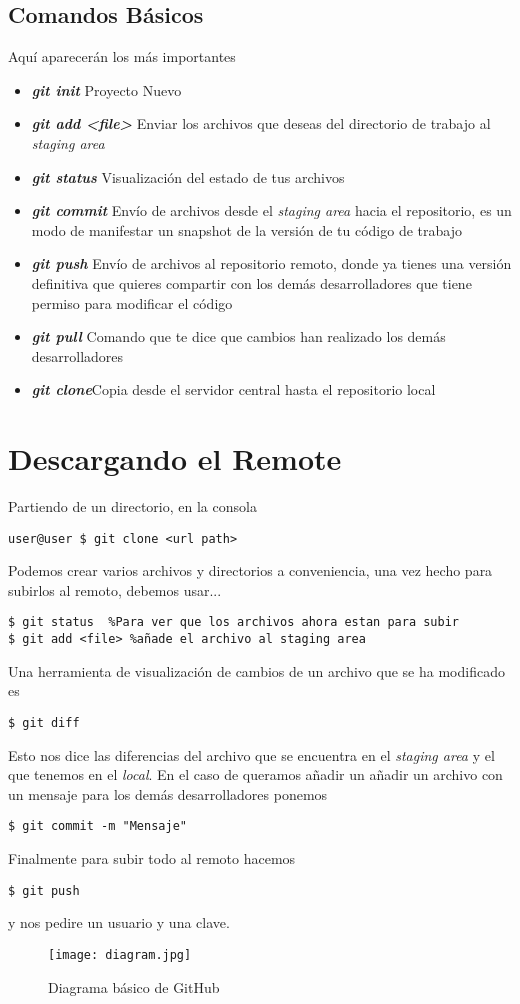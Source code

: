 \documentclass[letterpaper,12pt]{article}
\begin{document}
\subsection{Comandos Básicos}
Aquí aparecerán los más importantes
\begin{itemize}
\item \textbf{\textit{git init}} Proyecto Nuevo
\item \textbf{\textit{git add <file>}} Enviar los archivos que deseas del directorio de trabajo al \textit{staging area}
\item \textbf{\textit{git status}} Visualización del estado de tus archivos
\item \textbf{\textit{git commit}} Envío de archivos desde el \textit{staging area} hacia el repositorio, es un modo de manifestar un snapshot de la versión de tu código de trabajo
\item \textbf{\textit{git push}} Envío de archivos al repositorio remoto, donde ya tienes una versión definitiva que quieres compartir con los demás desarrolladores que tiene permiso para modificar el código
\item \textbf{\textit{git pull}} Comando que te dice que cambios han realizado los demás desarrolladores
\item \textbf{\textit{git clone}}Copia desde el servidor central hasta el repositorio local

\end{itemize}

\section{Descargando el Remote}
Partiendo de un directorio, en la consola
\begin{verbatim}
user@user $ git clone <url path>
\end{verbatim}
Podemos crear varios archivos y directorios a conveniencia, una vez hecho para subirlos al remoto, debemos usar...
\begin{verbatim}
$ git status  %Para ver que los archivos ahora estan para subir
$ git add <file> %añade el archivo al staging area
\end{verbatim}
Una herramienta de visualización de cambios de un archivo que se ha modificado es
\begin{verbatim}
$ git diff
\end{verbatim}
Esto nos dice las diferencias del archivo que se encuentra en el \textit{staging area} y el que tenemos en el \textit{local}. En el caso de queramos añadir un añadir un archivo con un mensaje para los demás desarrolladores ponemos
\begin{verbatim}
$ git commit -m "Mensaje"
\end{verbatim}
Finalmente para subir todo al remoto hacemos
\begin{verbatim}
$ git push
\end{verbatim}
y nos pedire un usuario y una clave.
\begin{figure}[!b]
	\centering
  \texttt{[image: diagram.jpg]}
  \caption{Diagrama básico de GitHub}
  \label{fig:diagram}
\end{figure}
\end{document}
